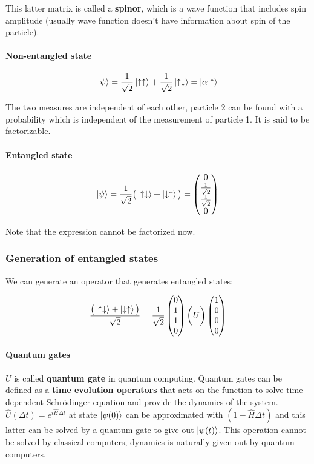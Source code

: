 		This latter matrix is called a \textbf{spinor}, which is a wave function that includes spin amplitude (usually wave function doesn't have information about spin of the particle).

			\paragraph{Non-entangled state}

			$$\ket{\psi}=\frac{1}{\sqrt{2}}\ket{\uparrow\uparrow}+\frac{1}{\sqrt{2}}\ket{\uparrow\downarrow}=\ket{\alpha\uparrow}$$

			The two measures are independent of each other, particle 2 can be found with a probability which is independent of the measurement of particle 1.
			It is said to be factorizable.

			\paragraph{Entangled state}

			$$\ket{\psi}=\frac{1}{\sqrt{2}}\big(\ket{\uparrow\downarrow}+\ket{\downarrow\uparrow}\big) = \begin{pmatrix}0\\\frac{1}{\sqrt{2}}\\\frac{1}{\sqrt{2}}\\0\end{pmatrix}$$

			Note that the expression cannot be factorized now.

		\subsubsection{Generation of entangled states}
		We can generate an operator that generates entangled states:

		$$\frac{\big(\ket{\uparrow\downarrow}+\ket{\downarrow\uparrow}\big)}{\sqrt{2}}=\frac{1}{\sqrt{2}}\begin{pmatrix}0\\1\\1\\0\end{pmatrix}\bigg(U\bigg)\begin{pmatrix}1\\0\\0\\0\end{pmatrix}$$

			\paragraph{Quantum gates}
			$U$ is called \textbf{quantum gate} in quantum computing.
			Quantum gates can be defined as a \textbf{time evolution operators} that acts on the function to solve time-dependent Schr\"odinger equation and provide the dynamics of the system.
			$\hat{U}(\Delta t) = e^{i\hat{H}\Delta t}$ at state $\ket{\psi(0)}$ can be approximated with $(1-\hat{H}\Delta t)$ and this latter can be solved by a quantum gate to give out $\ket{\psi(t)}$.
			This operation cannot be solved by classical computers, dynamics is naturally given out by quantum computers.

